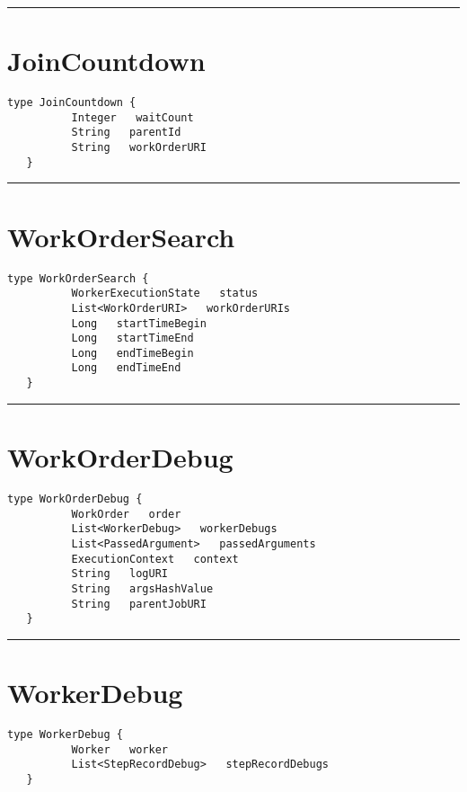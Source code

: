 \rule{12cm}{2pt}
\section{JoinCountdown}
\label{type:JoinCountdown}

\begin{lstlisting}[style=nonumbers]
   type JoinCountdown {
          Integer   waitCount
          String   parentId
          String   workOrderURI
   }
\end{lstlisting}

\rule{12cm}{2pt}
\section{WorkOrderSearch}
\label{type:WorkOrderSearch}

\begin{lstlisting}[style=nonumbers]
   type WorkOrderSearch {
          WorkerExecutionState   status
          List<WorkOrderURI>   workOrderURIs
          Long   startTimeBegin
          Long   startTimeEnd
          Long   endTimeBegin
          Long   endTimeEnd
   }
\end{lstlisting}

\rule{12cm}{2pt}
\section{WorkOrderDebug}
\label{type:WorkOrderDebug}

\begin{lstlisting}[style=nonumbers]
   type WorkOrderDebug {
          WorkOrder   order
          List<WorkerDebug>   workerDebugs
          List<PassedArgument>   passedArguments
          ExecutionContext   context
          String   logURI
          String   argsHashValue
          String   parentJobURI
   }
\end{lstlisting}

\rule{12cm}{2pt}
\section{WorkerDebug}
\label{type:WorkerDebug}

\begin{lstlisting}[style=nonumbers]
   type WorkerDebug {
          Worker   worker
          List<StepRecordDebug>   stepRecordDebugs
   }
\end{lstlisting}

